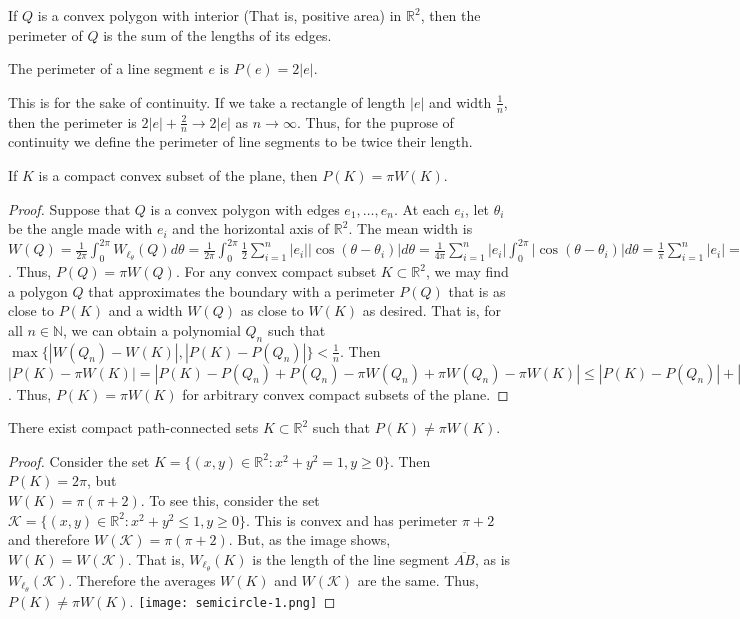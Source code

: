 \documentclass[crop=false,class=book]{standalone}
\begin{document}
\begin{definition}
If $Q$ is a convex polygon with interior (That is, positive area) in $\mathbb{R}^2$, then the perimeter of $Q$ is the sum of the lengths of its edges. 
\end{definition}
\begin{definition}
The perimeter of a line segment $e$ is $P(e) = 2|e|$.
\end{definition}
\begin{remark}
This is for the sake of continuity. If we take a rectangle of length $|e|$ and width $\frac{1}{n}$, then the perimeter is $2|e|+\frac{2}{n} \rightarrow 2|e|$ as $n\rightarrow \infty$. Thus, for the puprose of continuity we define the perimeter of line segments to be twice their length.
\end{remark}
\begin{theorem}
If $K$ is a compact convex subset of the plane, then $P(K) = \pi W(K)$.
\end{theorem}
\begin{proof}
Suppose that $Q$ is a convex polygon with edges $e_1,\hdots, e_n$. At each $e_i$, let $\theta_i$ be the angle made with $e_i$ and the horizontal axis of $\mathbb{R}^2$. The mean width is $W(Q) = \frac{1}{2\pi}\int_{0}^{2\pi} W_{\ell_\theta}(Q)d\theta = \frac{1}{2\pi} \int_{0}^{2\pi} \frac{1}{2} \sum_{i=1}^{n} |e_i||\cos(\theta-\theta_i)|d\theta = \frac{1}{4\pi}\sum_{i=1}^{n} |e_i|\int_{0}^{2\pi} |\cos(\theta-\theta_i)|d\theta = \frac{1}{\pi} \sum_{i=1}^{n} |e_i| = \frac{1}{\pi} P(Q)$. Thus, $P(Q) = \pi W(Q)$. For any convex compact subset $K\subset \mathbb{R}^2$, we may find a polygon $Q$ that approximates the boundary with a perimeter $P(Q)$ that is as close to $P(K)$ and a width $W(Q)$ as close to $W(K)$ as desired. That is, for all $n\in \mathbb{N}$, we can obtain a polynomial $Q_n$ such that $\max\{|W(Q_n)-W(K)|,|P(K)-P(Q_n)|\}< \frac{1}{n}$. Then $|P(K)-\pi W(K)| = |P(K) - P(Q_n)+P(Q_n)-\pi W(Q_n)+\pi W(Q_n)-\pi W(K)| \leq |P(K)-P(Q_n)|+|P(Q_n)-\pi W(Q_n)|+\pi|W(Q_n)-W(K)| < \frac{1}{n} + 0 + \frac{\pi}{n} = \frac{1+\pi}{n} \rightarrow 0$. Thus, $P(K) = \pi W(K)$ for arbitrary convex compact subsets of the plane.
\end{proof}
\begin{theorem}
There exist compact path-connected sets $K\subset \mathbb{R}^2$ such that $P(K) \ne \pi W(K)$.
\end{theorem}
\begin{proof}
Consider the set $K = \{(x,y) \in \mathbb{R}^2: x^2+y^2=1, y\geq 0\}$. Then $P(K) = 2\pi$, but \\ $W(K) = \pi(\pi+2)$. To see this, consider the set $\mathcal{K} = \{(x,y)\in \mathbb{R}^2: x^2 + y^2 \leq 1, y\geq 0\}$. This is convex and has perimeter $\pi+2$ and therefore $W(\mathcal{K}) = \pi(\pi+2)$. But, as the image shows, $W(K) = W(\mathcal{K})$. That is, $W_{\ell_{\theta}}(K)$ is the length of the line segment $\overline{AB}$, as is $W_{\ell_{\theta}}(\mathcal{K})$. Therefore the averages $W(K)$ and $W(\mathcal{K})$ are the same. Thus, $P(K) \ne \pi W(K)$.
\texttt{[image: semicircle-1.png]}
\end{proof}
\end{document}
